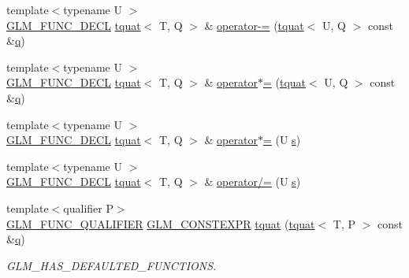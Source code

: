 \begin{DoxyCompactItemize}
\item 
{\footnotesize template$<$typename U $>$ }\\\mbox{\hyperlink{setup_8hpp_ab2d052de21a70539923e9bcbf6e83a51}{G\+L\+M\+\_\+\+F\+U\+N\+C\+\_\+\+D\+E\+CL}} \mbox{\hyperlink{structglm_1_1tquat}{tquat}}$<$ T, Q $>$ \& \mbox{\hyperlink{structglm_1_1tquat_a1f48d26214f6efcb8f1c6a222e45fae1}{operator-\/=}} (\mbox{\hyperlink{structglm_1_1tquat}{tquat}}$<$ U, Q $>$ const \&\mbox{\hyperlink{_s_d_l__opengl_8h_a8fc1e7b9baaae687804c7eed46ca09c6}{q}})
\item 
{\footnotesize template$<$typename U $>$ }\\\mbox{\hyperlink{setup_8hpp_ab2d052de21a70539923e9bcbf6e83a51}{G\+L\+M\+\_\+\+F\+U\+N\+C\+\_\+\+D\+E\+CL}} \mbox{\hyperlink{structglm_1_1tquat}{tquat}}$<$ T, Q $>$ \& \mbox{\hyperlink{structglm_1_1tquat_af1d51deda165d1be3e644353f9c26d55}{operator$\ast$=}} (\mbox{\hyperlink{structglm_1_1tquat}{tquat}}$<$ U, Q $>$ const \&\mbox{\hyperlink{_s_d_l__opengl_8h_a8fc1e7b9baaae687804c7eed46ca09c6}{q}})
\item 
{\footnotesize template$<$typename U $>$ }\\\mbox{\hyperlink{setup_8hpp_ab2d052de21a70539923e9bcbf6e83a51}{G\+L\+M\+\_\+\+F\+U\+N\+C\+\_\+\+D\+E\+CL}} \mbox{\hyperlink{structglm_1_1tquat}{tquat}}$<$ T, Q $>$ \& \mbox{\hyperlink{structglm_1_1tquat_aceb92eef28cbd87273cf81bf0bd71fde}{operator$\ast$=}} (U \mbox{\hyperlink{_s_d_l__opengl_8h_a4af680a6c683f88ed67b76f207f2e6e4}{s}})
\item 
{\footnotesize template$<$typename U $>$ }\\\mbox{\hyperlink{setup_8hpp_ab2d052de21a70539923e9bcbf6e83a51}{G\+L\+M\+\_\+\+F\+U\+N\+C\+\_\+\+D\+E\+CL}} \mbox{\hyperlink{structglm_1_1tquat}{tquat}}$<$ T, Q $>$ \& \mbox{\hyperlink{structglm_1_1tquat_aed8e8a44af5bcae23e60b4ddc170e762}{operator/=}} (U \mbox{\hyperlink{_s_d_l__opengl_8h_a4af680a6c683f88ed67b76f207f2e6e4}{s}})
\item 
{\footnotesize template$<$qualifier P$>$ }\\\mbox{\hyperlink{setup_8hpp_a33fdea6f91c5f834105f7415e2a64407}{G\+L\+M\+\_\+\+F\+U\+N\+C\+\_\+\+Q\+U\+A\+L\+I\+F\+I\+ER}} \mbox{\hyperlink{setup_8hpp_a08b807947b47031d3a511f03f89645ad}{G\+L\+M\+\_\+\+C\+O\+N\+S\+T\+E\+X\+PR}} \mbox{\hyperlink{structglm_1_1tquat_ab59e0622b75684ae91e699d2f4b41cef}{tquat}} (\mbox{\hyperlink{structglm_1_1tquat}{tquat}}$<$ T, P $>$ const \&\mbox{\hyperlink{_s_d_l__opengl_8h_a8fc1e7b9baaae687804c7eed46ca09c6}{q}})
\begin{DoxyCompactList}\small\item\em G\+L\+M\+\_\+\+H\+A\+S\+\_\+\+D\+E\+F\+A\+U\+L\+T\+E\+D\+\_\+\+F\+U\+N\+C\+T\+I\+O\+NS. \end{DoxyCompactList}\item 

\end{DoxyCompactItemize}

